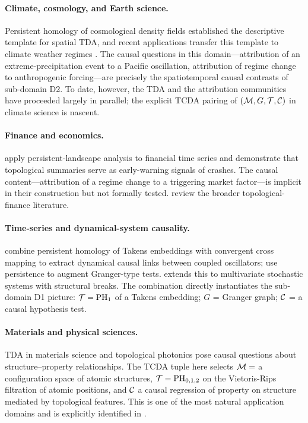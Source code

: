\paragraph{Climate, cosmology, and Earth science.}
Persistent homology of cosmological density fields
\citep{sousbie2011persistent,vandeweygaert2011alpha,
cisewski2014nonparametric} established the descriptive template for
spatial TDA, and recent applications transfer this template to climate
weather regimes \citep{strommen2025topological,smith2025multiscale,
smith2025harnessing}. The causal questions in this domain---attribution
of an extreme-precipitation event to a Pacific oscillation, attribution
of regime change to anthropogenic forcing---are precisely the
spatiotemporal causal contrasts of sub-domain D2. To date, however, the
TDA and the attribution communities have proceeded largely in parallel;
the explicit TCDA pairing of $(\mathcal{M}, G, \mathcal{T}, \mathcal{C})$ in climate science is
nascent.

\paragraph{Finance and economics.}
\citet{gidea2018topological,ismail2022early} apply persistent-landscape
analysis to financial time series and demonstrate that
topological summaries serve as early-warning signals of crashes. The
causal content---attribution of a regime change to a triggering market
factor---is implicit in their construction but not formally tested.
\citet{leykam2023topological} review the broader topological-finance
literature.

\paragraph{Time-series and dynamical-system causality.}
\citet{bando2022causal} combine persistent homology of Takens
embeddings with convergent cross mapping to extract dynamical causal
links between coupled oscillators; \citet{harnack2017causal,
gholizadeh2018short} use persistence to augment Granger-type tests.
\citet{krasnovsky2025causal} extends this to multivariate stochastic
systems with structural breaks. The combination directly instantiates
the sub-domain D1 picture: $\mathcal{T} = \mathrm{PH}_{1}$ of a Takens embedding;
$G$ = Granger graph; $\mathcal{C}$ = a causal hypothesis test.

\paragraph{Materials and physical sciences.}
TDA in materials science \citep{nigmetov2022topological} and topological
photonics \citep{leykam2023topological} pose causal questions about
structure--property relationships. The TCDA tuple here selects
$\mathcal{M} = $ a configuration space of atomic structures, $\mathcal{T} = \mathrm{PH}_{0,1,2}$
on the Vietoris-Rips filtration of atomic positions, and $\mathcal{C}$ a
causal regression of property on structure mediated by topological
features. This is one of the most natural application domains and is
explicitly identified in .


